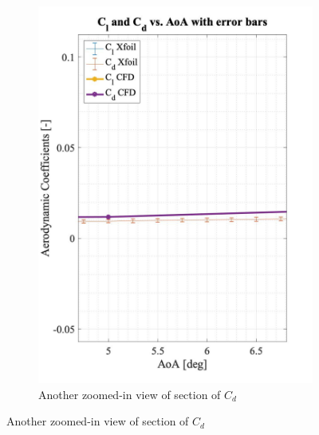 \begin{figure}[H]
\begin{subfigure}[b]{0.5\textwidth}
    \includegraphics[width=\textwidth]{error_bar3.jpg}
    \caption{Another zoomed-in view of section of $C_d$}
    \label{fig:error_bar3}
  \end{subfigure}
\end{figure}
